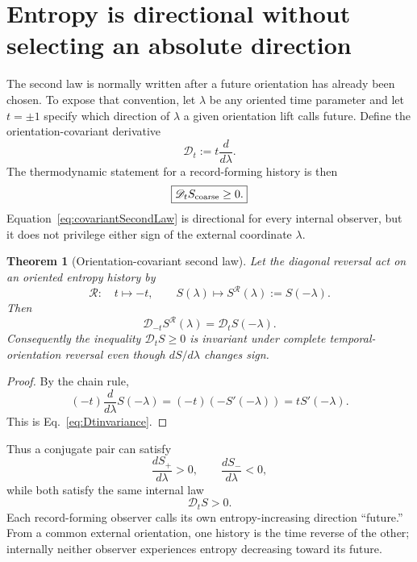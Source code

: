 \documentclass[11pt]{article}
\newtheorem{theorem}{Theorem}[section]
\theoremstyle{definition}\newtheorem{definition}[theorem]{Definition}
\theoremstyle{remark}\newtheorem{remark}[theorem]{Remark}\newtheorem{conjecture}[theorem]{Conjecture}
\begin{document}
\section{Entropy is directional without selecting an absolute direction}\label{sec:entropyorientation}
The second law is normally written after a future orientation has already been chosen. To expose that convention, let $\lambda$ be any oriented time parameter and let $t=\pm1$ specify which direction of $\lambda$ a given orientation lift calls future. Define the orientation-covariant derivative
\begin{equation}\label{eq:Dtdef}
 \boxed{\mathscr D_t:=t\frac{d}{d\lambda}.}
\end{equation}
The thermodynamic statement for a record-forming history is then
\begin{equation}\label{eq:covariantSecondLaw}
 \boxed{\mathscr D_t S_{\rm coarse}\ge0.}
\end{equation}
Equation~\eqref{eq:covariantSecondLaw} is directional for every internal observer, but it does not privilege either sign of the external coordinate $\lambda$.

\begin{theorem}[Orientation-covariant second law]\label{thm:orientationsecondlaw}
Let the diagonal reversal act on an oriented entropy history by
\begin{equation}\label{eq:entropydeck}
 \mathcal R:\quad t\mapsto-t,\qquad
 S(\lambda)\mapsto S^{\mathcal R}(\lambda):=S(-\lambda).
\end{equation}
Then
\begin{equation}\label{eq:Dtinvariance}
 \boxed{
 \mathscr D_{-t}S^{\mathcal R}(\lambda)
 =\mathscr D_tS(-\lambda).}
\end{equation}
Consequently the inequality $\mathscr D_tS\ge0$ is invariant under complete temporal-orientation reversal even though $dS/d\lambda$ changes sign.
\end{theorem}
\begin{proof}
By the chain rule,
\begin{equation}
 (-t)\frac{d}{d\lambda}S(-\lambda)
 =(-t)(-S'(-\lambda))
 =tS'(-\lambda).
\end{equation}
This is Eq.~\eqref{eq:Dtinvariance}.
\end{proof}

Thus a conjugate pair can satisfy
\begin{equation}\label{eq:oppositeentropycoordinate}
 \frac{dS_+}{d\lambda}>0,\qquad
 \frac{dS_-}{d\lambda}<0,
\end{equation}
while both satisfy the same internal law
\begin{equation}
 \mathscr D_tS>0.
\end{equation}
Each record-forming observer calls its own entropy-increasing direction ``future.'' From a common external orientation, one history is the time reverse of the other; internally neither observer experiences entropy decreasing toward its future.
\end{document}
